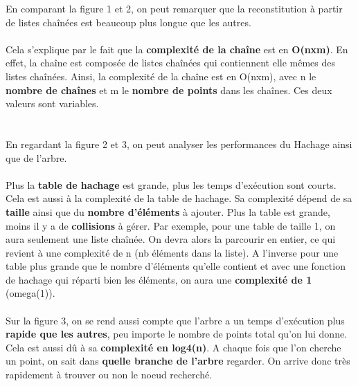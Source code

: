 \documentclass[12pt]{extarticle}
\begin{document}
En comparant la figure 1 et 2, on peut remarquer que la reconstitution à partir de listes chaînées est beaucoup plus longue que les autres.
\\ \\ 
Cela s'explique par le fait que la \textbf{complexité de la chaîne} est en \textbf{O(nxm)}. En effet, la chaîne est composée de listes chaînées qui contiennent elle mêmes des listes chaînées. Ainsi, la complexité de la chaîne est en O(nxm), avec n le \textbf{nombre de chaînes} et m le \textbf{nombre de points} dans les chaînes. Ces deux valeurs sont variables. 
\\ \\ \\
En regardant la figure 2 et 3, on peut analyser les performances du Hachage ainsi que de l'arbre.
\\ \\ 
Plus la \textbf{table de hachage} est grande, plus les temps d'exécution sont courts. Cela est aussi à la complexité de la table de hachage. Sa complexité dépend de sa \textbf{taille} ainsi que du \textbf{nombre d'éléments} à ajouter. Plus la table est grande, moins il y a de \textbf{collisions} à gérer. Par exemple, pour une table de taille 1, on aura seulement une liste chaînée. On devra alors la parcourir en entier, ce qui revient à une complexité de n (nb éléments dans la liste). A l'inverse pour une table plus grande que le nombre d'éléments qu'elle contient et avec une fonction de hachage qui réparti bien les éléments, on aura une \textbf{complexité de 1} (omega(1)).
\\ \\
Sur la figure 3, on se rend aussi compte que l'arbre a un temps d'exécution plus \textbf{rapide que les autres}, peu importe le nombre de points total qu'on lui donne. Cela est aussi dû à sa \textbf{complexité en log4(n)}. A chaque fois que l'on cherche un point, on sait dans \textbf{quelle branche de l'arbre} regarder. On arrive donc très rapidement à trouver ou non le noeud recherché.
\end{document}
